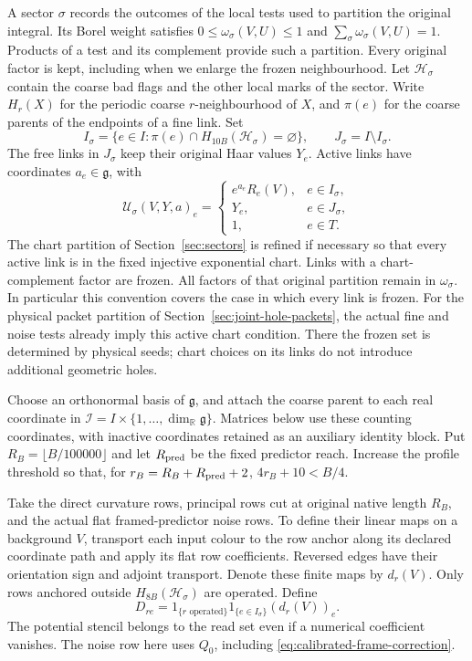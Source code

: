 \documentclass[11pt,reqno]{amsart}
\numberwithin{equation}{section}
\theoremstyle{definition}
\theoremstyle{remark}
\newcommand{\R}{\mathbb R}
\newcommand{\g}{\mathfrak g}
\begin{document}
A sector \(\sigma\) records the outcomes of the local tests used
to partition the original integral. Its Borel weight satisfies
\(0\le\omega_\sigma(V,U)\le1\) and
\(\sum_\sigma\omega_\sigma(V,U)=1\). Products of a test and
its complement provide such a partition. Every original factor
is kept, including when we enlarge the frozen neighbourhood.
Let \(\mathcal H_\sigma\) contain the coarse bad flags and the
other local marks of the sector. Write \(H_r(X)\) for the
periodic coarse \(r\)-neighbourhood of \(X\), and \(\pi(e)\)
for the coarse parents of the endpoints of a fine link. Set
\[
 I_\sigma=\{e\in I:\pi(e)\cap H_{10B}(\mathcal H_\sigma)=\varnothing\},
 \qquad J_\sigma=I\setminus I_\sigma.
\]
The free links in \(J_\sigma\) keep their original Haar values
\(Y_e\). Active links have coordinates \(a_e\in\g\), with
\begin{equation}
 \mathcal U_\sigma(V,Y,a)_e=
 \begin{cases}
  e^{a_e}R_e(V),&e\in I_\sigma,\\
  Y_e,&e\in J_\sigma,\\
  1,&e\in T.
 \end{cases}
 \label{eq:physical-selected-installation}
\end{equation}
The chart partition of Section~\ref{sec:sectors} is refined if
necessary so that every active link is in the fixed injective
exponential chart. Links with a chart-complement factor are
frozen. All factors of that original partition remain in
\(\omega_\sigma\). In particular this convention covers the
case in which every link is frozen.
For the physical packet partition of
Section~\ref{sec:joint-hole-packets}, the actual fine and noise
tests already imply this active chart condition. There the frozen
set is determined by physical seeds; chart choices on its links
do not introduce additional geometric holes.

Choose an orthonormal basis of \(\g\), and attach the coarse
parent to each real coordinate in
\(\mathcal I=I\times\{1,\ldots,\dim_\R\g\}\).
Matrices below use these counting coordinates, with inactive
coordinates retained as an auxiliary identity block.
Put \(R_B=\lfloor B/100000\rfloor\) and let \(R_{\rm pred}\)
be the fixed predictor reach. Increase the profile threshold so
that, for \(r_B=R_B+R_{\rm pred}+2\),
\(4r_B+10<B/4\).

Take the direct curvature rows, principal rows cut at original
native length \(R_B\), and the actual flat framed-predictor noise
rows. To define their linear maps on a background \(V\),
transport each input colour to the row anchor along its declared
coordinate path and apply its flat row coefficients. Reversed
edges have their orientation sign and adjoint transport. Denote
these finite maps by \(d_r(V)\). Only rows anchored outside
\(H_{8B}(\mathcal H_\sigma)\) are operated. Define
\[
 D_{re}=1_{\{r\text{ operated}\}}1_{\{e\in I_\sigma\}}(d_r(V))_e.
\]
The potential stencil belongs to the read set even if a numerical
coefficient vanishes. The noise row here uses \(Q_0\), including
\eqref{eq:calibrated-frame-correction}.
\end{document}

